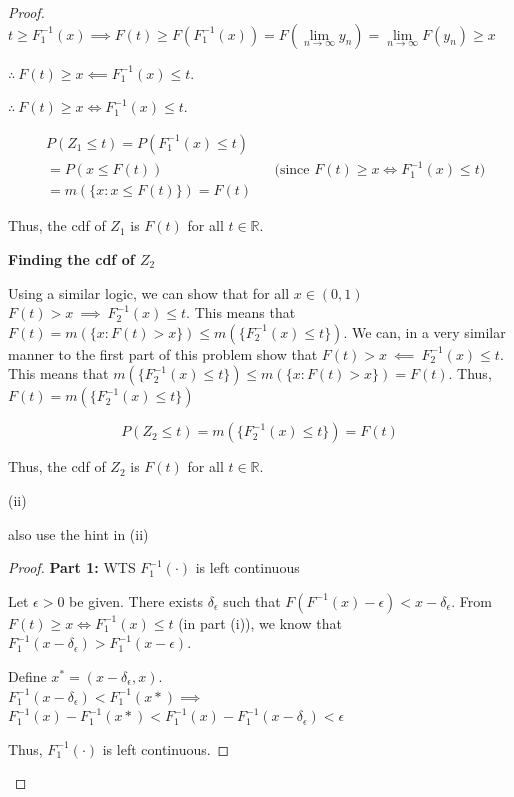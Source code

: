 \documentclass[12pt,letterpaper, onecolumn]{exam}
\newcommand{\real}{\mathbb{R}}
\newcommand{\cutelim}{\lim\limits_{n\to\infty}}
\begin{document}
\begin{questions}
\begin{solution}
\begin{proof}
        $t \geq F_1^{-1}(x) \implies F(t) \geq F(F_1^{-1}(x) ) = F(\cutelim y_n) = \cutelim F(y_n) \geq x$

        $\therefore \: F(t) \geq x \impliedby F_1^{-1}(x) \leq t.$

        $\therefore \: F(t) \geq x \iff F_1^{-1}(x) \leq t.$

        \begin{align*}
            & P(Z_1 \leq t) = P(F_1^{-1}(x) \leq t) \\
            & = P(x \leq F(t)) && \textrm{(since }F(t) \geq x \iff F_1^{-1}(x) \leq t) \\
            & = m(\{x: x \leq F(t)\}) = F(t)
        \end{align*}

        Thus, the cdf of $Z_1$ is $F(t)$ for all $t \in \real$.

        \textbf{Finding the cdf of $Z_2$}

        Using a similar logic, we can show that for all $x \in (0, 1)$ $F(t) > x \: \implies \: F_2^{-1} (x) \leq t$. This means that $F(t) = m(\{x: F(t) > x\}) \leq m(\{F_2^{-1}(x) \leq t\})$. We can, in a very similar manner to the first part of this problem show that $F(t) > x \: \impliedby \: F_2^{-1} (x) \leq t$. This means that $m(\{F_2^{-1}(x) \leq t\}) \leq m(\{x: F(t) > x\}) = F(t)$. Thus, $F(t) = m(\{F_2^{-1}(x) \leq t\})$

        $$P(Z_2 \leq t) = m(\{F_2^{-1}(x) \leq t\}) = F(t)$$

        Thus, the cdf of $Z_2$ is $F(t)$ for all $t \in \real$.
        
        (ii)

        also use the hint in (ii)
        \begin{proof}
            \textbf{Part 1:} WTS $F_1^{-1}(\cdot)$ is left continuous

            Let $\epsilon > 0$ be given. There exists $\delta_\epsilon$ such that $F(F^{-1}(x) - \epsilon) < x - \delta_\epsilon$. From $F(t) \geq x \iff F_1^{-1}(x) \leq t$ (in part (i)), we know that $F^{-1}_1(x - \delta_\epsilon) > F_1^{-1}(x-\epsilon)$. 

            Define $x^* = (x - \delta_\epsilon, x)$. \\
            $F_1^{-1}(x - \delta_\epsilon) <  F_1^{-1}(x*) \implies$ \\
            $F_1^{-1}(x) - F_1^{-1}(x*) < F_1^{-1}(x) - F_1^{-1}(x - \delta_\epsilon) < \epsilon$

            Thus, $F^{-1}_1(\cdot)$ is left continuous. 
            

\end{proof}
\end{proof}
\end{solution}
\end{questions}
\end{document}
